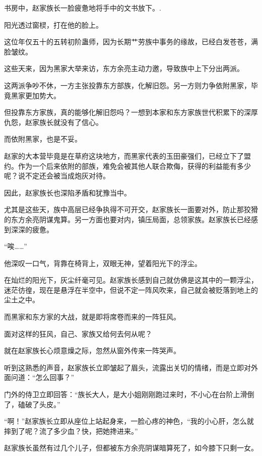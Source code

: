
\begin{this_body}

书房中，赵家族长一脸疲惫地将手中的文书放下。.

阳光透过窗棂，打在他的脸上。

这位年仅五十的五转初阶蛊师，因为长期艹劳族中事务的缘故，已经白发苍苍，满脸皱纹。

这些天来，因为黑家大举来访，东方余亮主动力邀，导致族中上下分出两派。

这两派争吵不休，一方主张投靠东方部族，化解旧怨。另一方则力争依附黑家，毕竟黑家更加势大。

但投靠东方家族，真的能够化解旧怨吗？一想到本家和东方家族世代积累下的深厚仇怨，赵家族长就没有了信心。

而依附黑家，也是不妥。

赵家的大本营毕竟是在草府这块地方，而黑家代表的玉田豪强们，已经立下了盟约。作为一个后来依附的部族，难免会被其他人联合欺侮，获得的利益能有多少呢？说不定还会被当成炮灰对待。

因此，赵家族长也深陷矛盾和犹豫当中。

尤其是这些天，族中高层已经争执得不可开交，赵家族长一面要对外，防止那狡猾的东方余亮阴谋鬼算。另一方面也要对内，镇压局面，总领家族。赵家族长已经感到深深的疲惫。

“唉……”

他深叹一口气，背靠在椅背上，双眼无神，望着阳光下的浮尘。

在灿烂的阳光下，灰尘纤毫可见。赵家族长感到自己就仿佛是这其中的一颗浮尘，迷茫彷徨，现在是悬浮在半空中，但说不定一阵风吹来，自己就会被贬落到地上的尘土之中。

而黑家和东方家的大战，就是即将席卷而来的一阵狂风。

面对这样的狂风，自己、家族又给何去何从呢？

就在赵家族长心烦意燥之际，忽然从窗外传来一阵哭声。

听到这熟悉的声音，赵家族长立即皱起了眉头，流露出关切的情绪，而是立即对外面问道：“怎么回事？”

门外的侍卫立即回答：“族长大人，是大小姐刚刚跑过来时，不小心在台阶上滑倒了，磕破了头皮。”

“啊！”赵家族长立即从座位上站起身来，一脸心疼的神色，“我的小心肝，怎么就摔到了呢？流了多少血？快，把她搀进来。”

赵家族长虽然有过几个儿子，但都被东方余亮阴谋暗算死了，如今膝下只剩一女。


\end{this_body}
